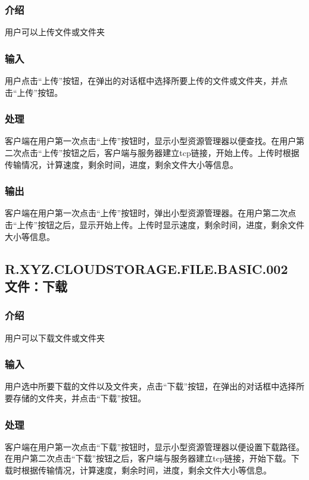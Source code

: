 \subsubsection{介绍}
用户可以上传文件或文件夹

\subsubsection{输入}
用户点击“上传”按钮，在弹出的对话框中选择所要上传的文件或文件夹，并点击“上传”按钮。

\subsubsection{处理}
客户端在用户第一次点击“上传”按钮时，显示小型资源管理器以便查找。在用户第二次点击“上传”按钮之后，客户端与服务器建立tcp链接，开始上传。上传时根据传输情况，计算速度，剩余时间，进度，剩余文件大小等信息。

\subsubsection{输出}
客户端在用户第一次点击“上传”按钮时，弹出小型资源管理器。在用户第二次点击“上传”按钮之后，显示开始上传。上传时显示速度，剩余时间，进度，剩余文件大小等信息。




\subsection{R.XYZ.CLOUDSTORAGE.FILE.BASIC.002 文件：下载}

\subsubsection{介绍}
用户可以下载文件或文件夹

\subsubsection{输入}
用户选中所要下载的文件以及文件夹，点击“下载”按钮，在弹出的对话框中选择所要存储的文件夹，并点击“下载”按钮。

\subsubsection{处理}
客户端在用户第一次点击“下载”按钮时，显示小型资源管理器以便设置下载路径。在用户第二次点击“下载”按钮之后，客户端与服务器建立tcp链接，开始下载。下载时根据传输情况，计算速度，剩余时间，进度，剩余文件大小等信息。

